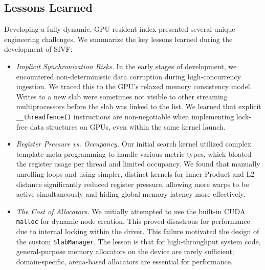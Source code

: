 \documentclass[sigconf,nonacm]{acmart}
\theoremstyle{plain}
\theoremstyle{definition}
\theoremstyle{remark}
\begin{document}
\subsection{Lessons Learned}
\label{app:lessons_learned}

Developing a fully dynamic, GPU-resident index presented several unique engineering challenges. We summarize the key lessons learned during the development of SIVF:

\begin{itemize}
    \item \textit{Implicit Synchronization Risks.} In the early stages of development, we encountered non-deterministic data corruption during high-concurrency ingestion. We traced this to the GPU's relaxed memory consistency model. Writes to a new slab were sometimes not visible to other streaming multiprocessors before the slab was linked to the list. We learned that explicit \texttt{\_\_threadfence()} instructions are non-negotiable when implementing lock-free data structures on GPUs, even within the same kernel launch.
    
    \item \textit{Register Pressure vs. Occupancy.} Our initial search kernel utilized complex template meta-programming to handle various metric types, which bloated the register usage per thread and limited occupancy. We found that manually unrolling loops and using simpler, distinct kernels for Inner Product and L2 distance significantly reduced register pressure, allowing more warps to be active simultaneously and hiding global memory latency more effectively.
    
    \item \textit{The Cost of Allocators.} We initially attempted to use the built-in CUDA \texttt{malloc} for dynamic node creation. This proved disastrous for performance due to internal locking within the driver. This failure motivated the design of the custom \texttt{SlabManager}. The lesson is that for high-throughput system code, general-purpose memory allocators on the device are rarely sufficient; domain-specific, arena-based allocators are essential for performance.
\end{itemize}
\end{document}
